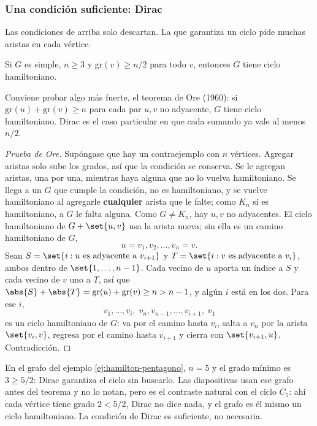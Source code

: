 \documentclass[11pt,letterpaper]{article}
\begin{document}
\subsubsection*{Una condición suficiente: Dirac}

Las condiciones de arriba solo descartan. La que garantiza un ciclo
pide muchas aristas en cada vértice.

\begin{teorema}[Dirac, 1952]
  \label{teo:hamilton-dirac}
  Si $G$ es simple, $n \ge 3$ y $\text{gr}(v) \ge n/2$ para todo
  $v$, entonces $G$ tiene ciclo hamiltoniano.
\end{teorema}

Conviene probar algo más fuerte, el teorema de Ore (1960): si
$\text{gr}(u) + \text{gr}(v) \ge n$ para cada par $u, v$ no
adyacente, $G$ tiene ciclo hamiltoniano. Dirac es el caso particular
en que cada sumando ya vale al menos $n/2$.

\begin{proof}[Prueba de Ore]
  Supóngase que hay un contraejemplo con $n$ vértices. Agregar
  aristas solo sube los grados, así que la condición se conserva. Se
  le agregan aristas, una por una, mientras haya alguna que no lo
  vuelva hamiltoniano. Se llega a un $G$ que cumple la condición, no
  es hamiltoniano, y se vuelve hamiltoniano al agregarle
  \textbf{cualquier} arista que le falte; como $K_n$ sí es
  hamiltoniano, a $G$ le falta alguna. Como $G \ne K_n$, hay $u, v$
  no adyacentes. El ciclo hamiltoniano de $G + \set{u, v}$ usa la
  arista nueva; sin ella es un camino hamiltoniano de $G$,
  \[
    u = v_1, v_2, \dots, v_n = v .
  \]
  Sean $S = \set{i : u \text{ es adyacente a } v_{i+1}}$ y
  $T = \set{i : v \text{ es adyacente a } v_i}$, ambos dentro de
  $\set{1, \dots, n-1}$. Cada vecino de $u$ aporta un índice a $S$ y
  cada vecino de $v$ uno a $T$, así que
  $\abs{S} + \abs{T} = \text{gr}(u) + \text{gr}(v) \ge n > n - 1$, y
  algún $i$ está en los dos. Para ese $i$,
  \[
    v_1, \dots, v_i, \; v_n, v_{n-1}, \dots, v_{i+1}, \; v_1
  \]
  es un ciclo hamiltoniano de $G$: va por el camino hasta $v_i$,
  salta a $v_n$ por la arista $\set{v_i, v}$, regresa por el camino
  hasta $v_{i+1}$ y cierra con $\set{v_{i+1}, u}$. Contradicción.
\end{proof}

\begin{ejemplo}
  En el grafo del ejemplo \ref{ej:hamilton-pentagono}, $n = 5$ y el
  grado mínimo es $3 \ge 5/2$: Dirac garantiza el ciclo sin
  buscarlo. Las diapositivas usan ese grafo antes del teorema y no lo
  notan, pero es el contraste natural con el ciclo $C_5$: ahí cada
  vértice tiene grado $2 < 5/2$, Dirac no dice nada, y el grafo es él
  mismo un ciclo hamiltoniano. La condición de Dirac es suficiente,
  no necesaria.
\end{ejemplo}
\end{document}
